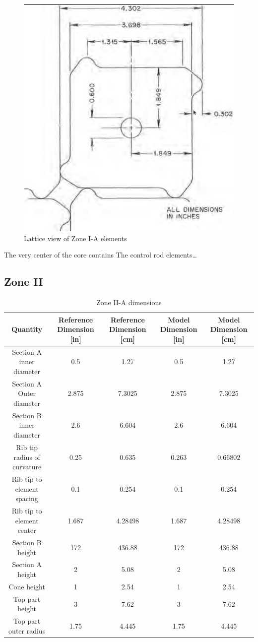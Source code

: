 \begin{figure}[htpb]
    \centering
    \includegraphics[width=0.25\linewidth]{figs/ch4/zone_ia_lattice_ref.png}
    \caption{Lattice view of Zone I-A elements}
    \label{fig:msbr-ia-lattice}
\end{figure}

The very center of the core contains The control rod elements\ldots


\subsection{Zone II}

\begin{table}[htpb]
    \centering
    \caption{Zone II-A dimensions}
    \label{tab:zone-iia-specs}
    \begin{tabulary}{\linewidth}{|C|CC|CC|}
    \hline
    Quantity & Reference Dimension [in] & Reference Dimension [\unit{\centi\metre}] & Model Dimension [in] & Model Dimension [\unit{\centi\metre}]\\
    \hline
    Section A inner diameter & 0.5 & 1.27 & 0.5 & 1.27 \\
    \hline
    Section A Outer diameter & 2.875 & 7.3025 & 2.875 & 7.3025 \\
    \hline
    Section B inner diameter & 2.6 & 6.604 & 2.6 & 6.604 \\
    \hline
    Rib tip radius of curvature & 0.25 & 0.635 & 0.263 & 0.66802\\
    \hline
    Rib tip to element spacing & 0.1 & 0.254 & 0.1 & 0.254\\
    \hline
    Rib tip to element center & 1.687 & 4.28498 & 1.687 & 4.28498\\
    \hline
    Section B height & 172 & 436.88 & 172 & 436.88\\
    \hline
    Section A height & 2 & 5.08 & 2 & 5.08 \\
    \hline
    Cone height & 1 & 2.54 & 1 & 2.54 \\
    \hline
    Top part height & 3 & 7.62 & 3 & 7.62 \\
    \hline
    Top part outer radius & 1.75 & 4.445 & 1.75 & 4.445 \\
    \hline
    \end{tabulary}
\end{table}

